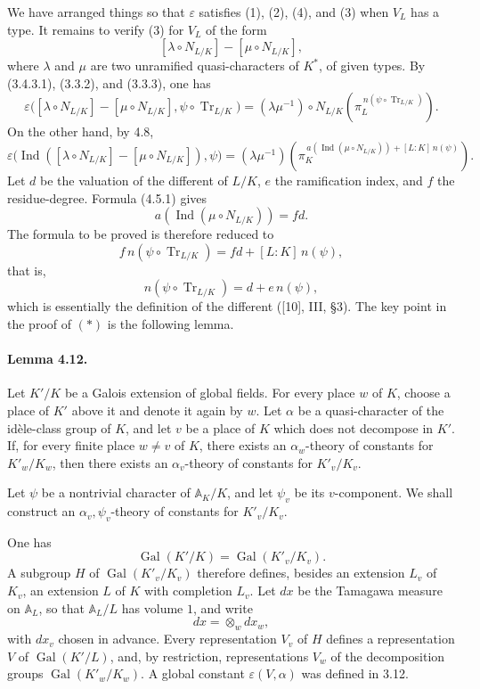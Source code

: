 \documentclass[10pt]{article}
\newcommand{\Gal}{\operatorname{Gal}}
\newcommand{\Ind}{\operatorname{Ind}}
\newcommand{\Tr}{\operatorname{Tr}}
\providecommand{\Gal}{\operatorname{Gal}}
\providecommand{\Gal}{\operatorname{Gal}}
\providecommand{\Tr}{\operatorname{Tr}}
\providecommand{\Gal}{\operatorname{Gal}}
\providecommand{\Tr}{\operatorname{Tr}}
\providecommand{\Gal}{\operatorname{Gal}}
\providecommand{\Tr}{\operatorname{Tr}}
\providecommand{\Ind}{\operatorname{Ind}}
\begin{document}
We have arranged things so that \(\varepsilon\) satisfies (1), (2), (4), and (3) when \(V_L\) has a type. It remains to verify (3) for \(V_L\) of the form
\[
[\lambda\circ N_{L/K}]-[\mu\circ N_{L/K}],
\]
where \(\lambda\) and \(\mu\) are two unramified quasi-characters of \(K^*\), of given types. By (3.4.3.1), (3.3.2), and (3.3.3), one has
\[
\varepsilon\bigl([\lambda\circ N_{L/K}]-[\mu\circ N_{L/K}],
\psi\circ\Tr_{L/K}\bigr)
=
(\lambda\mu^{-1})\circ N_{L/K}
\left(\pi_L^{\,n(\psi\circ\Tr_{L/K})}\right).
\]
On the other hand, by 4.8,
\[
\varepsilon\bigl(\Ind([\lambda\circ N_{L/K}]-[\mu\circ N_{L/K}]),\psi\bigr)
=
(\lambda\mu^{-1})
\left(\pi_K^{\,a(\Ind(\mu\circ N_{L/K}))+[L:K]\,n(\psi)}\right).
\]
Let \(d\) be the valuation of the different of \(L/K\), \(e\) the ramification index, and \(f\) the residue-degree. Formula (4.5.1) gives
\[
a(\Ind(\mu\circ N_{L/K}))=fd.
\]
The formula to be proved is therefore reduced to
\[
f\,n(\psi\circ\Tr_{L/K})=fd+[L:K]\,n(\psi),
\]
that is,
\[
n(\psi\circ\Tr_{L/K})=d+e\,n(\psi),
\]
which is essentially the definition of the different ([10], III, §3). The key point in the proof of \((*)\) is the following lemma.

\paragraph{Lemma 4.12.} Let \(K'/K\) be a Galois extension of global fields. For every place \(w\) of \(K\), choose a place of \(K'\) above it and denote it again by \(w\). Let \(\alpha\) be a quasi-character of the idèle-class group of \(K\), and let \(v\) be a place of \(K\) which does not decompose in \(K'\). If, for every finite place \(w\ne v\) of \(K\), there exists an \(\alpha_w\)-theory of constants for \(K'_w/K_w\), then there exists an \(\alpha_v\)-theory of constants for \(K'_v/K_v\).

Let \(\psi\) be a nontrivial character of \(\mathbb A_K/K\), and let \(\psi_v\) be its \(v\)-component. We shall construct an \(\alpha_v,\psi_v\)-theory of constants for \(K'_v/K_v\).

One has
\[
\Gal(K'/K)=\Gal(K'_v/K_v).
\]
A subgroup \(H\) of \(\Gal(K'_v/K_v)\) therefore defines, besides an extension \(L_v\) of \(K_v\), an extension \(L\) of \(K\) with completion \(L_v\). Let \(dx\) be the Tamagawa measure on \(\mathbb A_L\), so that \(\mathbb A_L/L\) has volume \(1\), and write
\[
dx=\otimes_w dx_w,
\]
with \(dx_v\) chosen in advance. Every representation \(V_v\) of \(H\) defines a representation \(V\) of \(\Gal(K'/L)\), and, by restriction, representations \(V_w\) of the decomposition groups \(\Gal(K'_w/K_w)\). A global constant \(\varepsilon(V,\alpha)\) was defined in 3.12.
\end{document}
